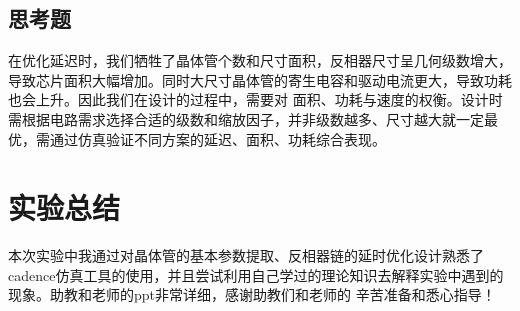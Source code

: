 \documentclass[UTF8]{ctexart}
\begin{document}
\subsection{思考题}

在优化延迟时，我们牺牲了晶体管个数和尺寸面积，反相器尺寸呈几何级数增大，导致芯片面积大幅增加。同时大尺寸晶体管的寄生电容和驱动电流更大，导致功耗也会上升。因此我们在设计的过程中，需要对
面积、功耗与速度的权衡。设计时需根据电路需求选择合适的级数和缩放因子，并非级数越多、尺寸越大就一定最优，需通过仿真验证不同方案的延迟、面积、功耗综合表现。

\section{实验总结}
本次实验中我通过对晶体管的基本参数提取、反相器链的延时优化设计熟悉了cadence仿真工具的使用，并且尝试利用自己学过的理论知识去解释实验中遇到的现象。助教和老师的ppt非常详细，感谢助教们和老师的
辛苦准备和悉心指导！
\end{document}
